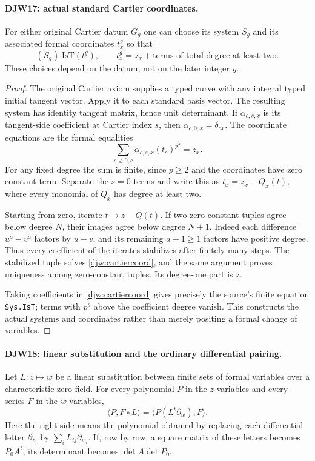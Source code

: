 \paragraph{DJW17: actual standard Cartier coordinates.}
\label{claim:DJW17}
For either original Cartier datum $G_g$ one can choose its system
$S_g$ and its associated formal coordinates $t^g_x$ so that
\[
 (S_g).\mathrm{IsT}(t^g),\qquad
 t^g_x=z_x+\text{terms of total degree at least two}.
\]
These choices depend on the datum, not on the later integer $y$.

\begin{proof}
The original Cartier axiom supplies a typed curve with any integral
typed initial tangent vector.  Apply it to each standard basis vector.
The resulting system has identity tangent matrix, hence unit
determinant.  If $\alpha_{c,s,x}$ is its tangent-side coefficient
at Cartier index $s$, then $\alpha_{c,0,x}=\delta_{cx}$.
The coordinate equations are the formal equalities
\begin{equation}
 \sum_{s\ge0,c}\alpha_{c,s,x}(t_c)^{p^s}=z_x.
 \label{djw:cartiercoord}
\end{equation}
For any fixed degree the sum is finite, since $p\ge2$ and the
coordinates have zero constant term.  Separate the $s=0$ terms
and write this as $t_x=z_x-Q_x(t)$, where every monomial of
$Q_x$ has degree at least two.

Starting from zero, iterate $t\mapsto z-Q(t)$.
If two zero-constant tuples agree below degree $N$, their images
agree below degree $N+1$.  Indeed each difference
$u^a-v^a$ factors by $u-v$, and its remaining $a-1\ge1$
factors have positive degree.  Thus every coefficient of the
iterates stabilizes after finitely many steps.  The stabilized
tuple solves \eqref{djw:cartiercoord}, and the same argument
proves uniqueness among zero-constant tuples.  Its degree-one
part is $z$.

Taking coefficients in \eqref{djw:cartiercoord} gives precisely
the source's finite equation \texttt{Sys.IsT}; terms with
$p^s$ above the coefficient degree vanish.  This constructs the
actual systems and coordinates rather than merely positing a
formal change of variables.
\end{proof}

\paragraph{DJW18: linear substitution and the ordinary differential pairing.}
\label{claim:DJW18}
Let $L:z\mapsto w$ be a linear substitution between finite sets
of formal variables over a characteristic-zero field.  For every
polynomial $P$ in the $z$ variables and every series $F$ in the
$w$ variables,
\begin{equation}
 \langle P,F\circ L\rangle
       =\langle P(L^t\partial_w),F\rangle.
 \label{djw:linearjet}
\end{equation}
Here the right side means the polynomial obtained by replacing
each differential letter $\partial_{z_j}$ by
$\sum_iL_{ij}\partial_{w_i}$.  If, row by row, a square matrix
of these letters becomes $P_0A^t$, its determinant becomes
$\det A\det P_0$.

